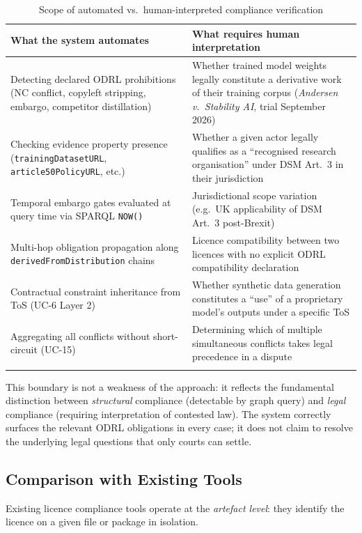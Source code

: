 \documentclass[12pt,a4paper]{article}
\begin{document}
\begin{longtable}{@{}p{7.0cm}p{7.0cm}@{}}
\toprule
\textbf{What the system automates} & \textbf{What requires human interpretation} \\
\midrule
\endhead
Detecting declared ODRL prohibitions (NC conflict, copyleft stripping, embargo, competitor distillation) & Whether trained model weights legally constitute a derivative work of their training corpus (\textit{Andersen v.\ Stability AI}, trial September 2026) \\[6pt]
Checking evidence property presence (\texttt{trainingDatasetURL}, \texttt{article50PolicyURL}, etc.) & Whether a given actor legally qualifies as a ``recognised research organisation'' under DSM Art.\ 3 in their jurisdiction \\[6pt]
Temporal embargo gates evaluated at query time via SPARQL \texttt{NOW()} & Jurisdictional scope variation (e.g.\ UK applicability of DSM Art.\ 3 post-Brexit) \\[6pt]
Multi-hop obligation propagation along \texttt{derivedFromDistribution} chains & Licence compatibility between two licences with no explicit ODRL compatibility declaration \\[6pt]
Contractual constraint inheritance from ToS (UC-6 Layer 2) & Whether synthetic data generation constitutes a ``use'' of a proprietary model's outputs under a specific ToS \\[6pt]
Aggregating all conflicts without short-circuit (UC-15) & Determining which of multiple simultaneous conflicts takes legal precedence in a dispute \\
\bottomrule
\caption{Scope of automated vs.\ human-interpreted compliance verification}
\end{longtable}

This boundary is not a weakness of the approach: it reflects the fundamental distinction between \emph{structural} compliance (detectable by graph query) and \emph{legal} compliance (requiring interpretation of contested law). The system correctly surfaces the relevant ODRL obligations in every case; it does not claim to resolve the underlying legal questions that only courts can settle.

\subsection{Comparison with Existing Tools}

Existing licence compliance tools operate at the \emph{artefact level}: they identify the licence on a given file or package in isolation.
\end{document}
